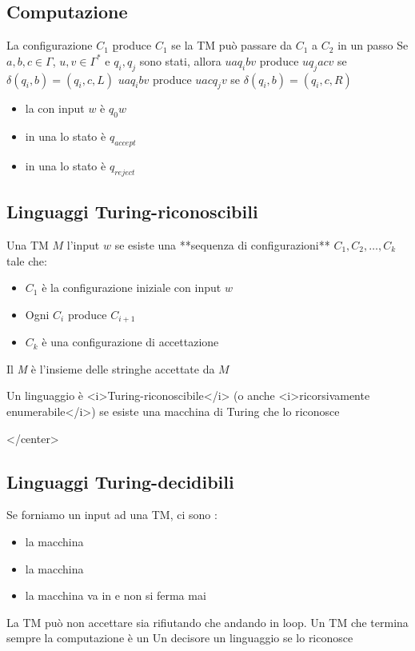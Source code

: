 \subsection{Computazione}
La configurazione $C_1$ \b{produce} $C_1$ se la TM può passare da $C_1$ a $C_2$ in un passo
Se $a,b,c\in\Gamma$, $u,v\in\Gamma^*$ e $q_i, q_j$ sono stati, allora
	$uaq_ibv$ produce $uq_jacv$ se $\delta(q_i, b)= (q_i, c, L)$ 
	$uaq_ibv$ produce $uacq_jv$ se $\delta(q_i, b)= (q_i, c, R)$ 
\begin{itemize}
	\item la  con input $w$ è $q_0w$ 
	\item in una  lo stato è $q_{accept}$ 
	\item in una  lo stato è $q_{reject}$
\end{itemize}
\subsection{Linguaggi Turing-riconoscibili}
Una TM $M$  l'input $w$ se esiste una **sequenza di configurazioni** $C_1, C_2,\dots, C_k$ tale che: 
\begin{itemize}
	\item $C_1$ è la configurazione iniziale con input $w$ 
	\item Ogni $C_i$ produce $C_{i+1}$ 
	\item $C_k$ è una configurazione di accettazione
\end{itemize}
Il  \textit{M} è l'insieme delle stringhe accettate da $M$ 

\begin{theorem}
	Un linguaggio è <i>Turing-riconoscibile</i> (o anche <i>ricorsivamente enumerabile</i>) se esiste una macchina di Turing che lo riconosce
\end{theorem}
</center>

\subsection{Linguaggi Turing-decidibili}
Se forniamo un input ad una TM, ci sono :
\begin{itemize}
	\item la macchina 
	\item la macchina  
	\item la macchina va in  e non si ferma mai
\end{itemize}
La TM può non accettare sia rifiutando che andando in loop.
Un TM che termina sempre la computazione è un  
Un decisore  un linguaggio se lo riconosce 


